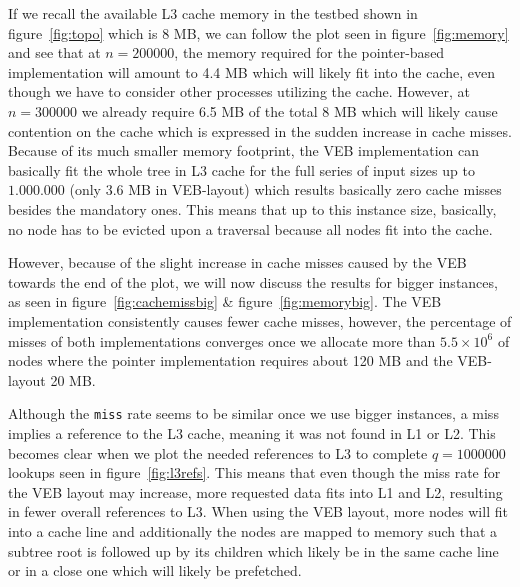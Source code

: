 \documentclass{article}
\begin{document}


If we recall the available L3 cache memory in the testbed shown in figure~\ref{fig:topo} which is 8 MB, we can follow the plot seen in figure~\ref{fig:memory} and see that at $n=200000$, the memory required for the pointer-based implementation will amount to 4.4 MB which will likely fit into the cache, even though we have to consider other processes utilizing the cache. However, at  $n=300000$ we already require 6.5 MB of the total 8 MB which will likely cause contention on the cache which is expressed in the sudden increase in cache misses. Because of its much smaller memory footprint, the VEB implementation can basically fit the whole tree in L3 cache for the full series of input sizes up to $1.000.000$ (only 3.6 MB in VEB-layout) which results basically zero cache misses besides the mandatory ones. This means that up to this instance size, basically, no node has to be evicted upon a traversal because all nodes fit into the cache. 


However, because of the slight increase in cache misses caused by the VEB towards the end of the plot, we will now discuss the results for bigger instances, as seen in figure~\ref{fig:cachemissbig} \& figure~\ref{fig:memorybig}. The VEB implementation consistently causes fewer cache misses, however, the percentage of misses of both implementations converges once we allocate more than $5.5 \times 10^6$ of nodes where the pointer implementation requires about 120 MB and the VEB-layout 20 MB. 


Although the \texttt{miss} rate seems to be similar once we use bigger instances, a miss implies a reference to the L3 cache, meaning it was not found in L1 or L2. This becomes clear when we plot the needed references to L3 to complete $q = 1000000$ lookups seen in figure~\ref{fig:l3refs}. This means that even though the miss rate for the VEB layout may increase, more requested data fits into L1 and L2, resulting in fewer overall references to L3. When using the VEB layout, more nodes will fit into a cache line and additionally the nodes are mapped to memory such that a subtree root is followed up by its children which likely be in the same cache line or in a close one which will likely be prefetched. 

\end{document}

